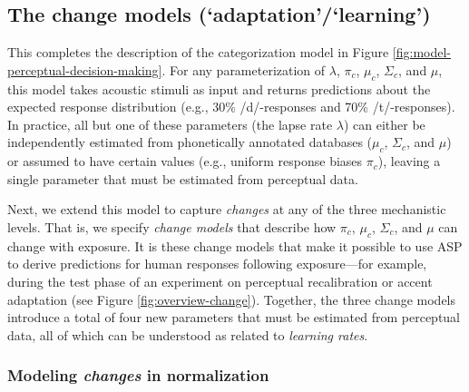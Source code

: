 \documentclass[
  11pt,
  english,
  man,floatsintext]{apa6}
\begin{document}
\hypertarget{the-change-models-adaptationlearning}{%
\subsection{The change models (`adaptation'/`learning')}\label{the-change-models-adaptationlearning}}

This completes the description of the categorization model in Figure \ref{fig:model-perceptual-decision-making}. For any parameterization of \(\lambda\), \(\pi_c\), \(\mu_c\), \(\Sigma_c\), and \(\mu\), this model takes acoustic stimuli as input and returns predictions about the expected response distribution (e.g., 30\% /d/-responses and 70\% /t/-responses). In practice, all but one of these parameters (the lapse rate \(\lambda\)) can either be independently estimated from phonetically annotated databases (\(\mu_c\), \(\Sigma_c\), and \(\mu\)) or assumed to have certain values (e.g., uniform response biases \(\pi_c\)), leaving a single parameter that must be estimated from perceptual data.

Next, we extend this model to capture \emph{changes} at any of the three mechanistic levels. That is, we specify \emph{change models} that describe how \(\pi_c\), \(\mu_c\), \(\Sigma_c\), and \(\mu\) can change with exposure. It is these change models that make it possible to use ASP to derive predictions for human responses following exposure---for example, during the test phase of an experiment on perceptual recalibration or accent adaptation (see Figure \ref{fig:overview-change}). Together, the three change models introduce a total of four new parameters that must be estimated from perceptual data, all of which can be understood as related to \emph{learning rates}.

\hypertarget{sec:change-normalization}{%
\subsubsection{\texorpdfstring{Modeling \emph{changes} in normalization}{Modeling changes in normalization}}\label{sec:change-normalization}}
\end{document}
